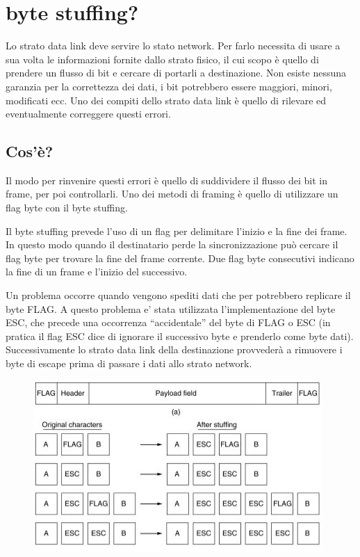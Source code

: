 \section{byte stuffing?}
Lo strato data link deve servire lo stato network. Per farlo necessita di usare a sua volta le informazioni fornite dallo strato fisico, il cui scopo è quello di prendere un flusso di bit e cercare di portarli a destinazione.
Non esiste nessuna garanzia per la correttezza dei dati, i bit potrebbero essere maggiori, minori, modificati ecc. Uno dei compiti dello strato data link è quello di rilevare ed eventualmente correggere questi errori.
\subsection{Cos'è?}
Il modo per rinvenire questi errori è quello di suddividere il flusso dei bit in frame, per poi controllarli. Uno dei metodi di framing è quello di utilizzare un flag byte con il byte stuffing.

Il byte stuffing prevede l'uso di un flag per delimitare l'inizio e la fine dei frame. In questo modo quando il destinatario perde la sincronizzazione può cercare il flag byte per trovare la fine del frame corrente. Due flag byte consecutivi indicano la fine di un frame e l'inizio del successivo.

Un problema occorre quando vengono spediti dati che per potrebbero replicare il byte FLAG. A questo problema e' stata utilizzata l'implementazione del byte ESC, che precede una occorrenza “accidentale” del byte di FLAG o ESC (in pratica il flag ESC dice di ignorare il successivo byte e prenderlo come byte dati). Successivamente lo strato data link della destinazione provvederà a rimuovere i byte di escape prima di passare i dati allo strato network.


\begin{figure}[H]
\centering
\includegraphics[scale=0.8]{res/img/13_ByteStuffing.png}
\end{figure}

